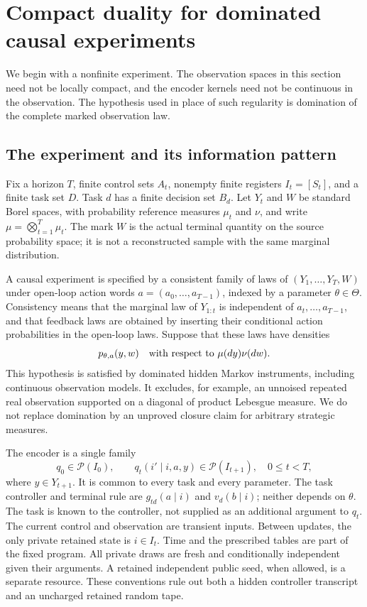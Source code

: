 \section{Compact duality for dominated causal experiments}
\label{sec:v10-compact}

We begin with a nonfinite experiment. The observation spaces in this
section need not be locally compact, and the encoder kernels need not
be continuous in the observation. The hypothesis used in place of such
regularity is domination of the complete marked observation law.

\subsection{The experiment and its information pattern}
Fix a horizon $T$, finite control sets $A_t$, nonempty finite registers
$I_t=[S_t]$, and a finite task set $D$. Task $d$ has a finite decision
set $B_d$. Let $Y_t$ and $W$ be standard Borel spaces, with probability
reference measures $\mu_t$ and $\nu$, and write
$\mu=\bigotimes_{t=1}^T\mu_t$. The mark $W$ is the actual terminal
quantity on the source probability space; it is not a reconstructed
sample with the same marginal distribution.

A causal experiment is specified by a consistent family of laws of
$(Y_1,\ldots,Y_T,W)$ under open-loop action words
$a=(a_0,\ldots,a_{T-1})$, indexed by a parameter $\theta\in\Theta$.
Consistency means that the marginal law of $Y_{1:t}$ is independent of
$a_t,\ldots,a_{T-1}$, and that feedback laws are obtained by inserting
their conditional action probabilities in the open-loop laws. Suppose
that these laws have densities
\begin{equation}\label{eq:v10-density}
 p_{\theta,a}(y,w)\quad\hbox{with respect to }\mu(dy)\nu(dw).
\end{equation}
This hypothesis is satisfied by dominated hidden Markov instruments,
including continuous observation models. It excludes, for example, an
unnoised repeated real observation supported on a diagonal of product
Lebesgue measure. We do not replace domination by an unproved closure
claim for arbitrary strategic measures.

The encoder is a single family
\[
 q_0\in\mathcal P(I_0),\qquad
 q_t(i'\mid i,a,y)\in\mathcal P(I_{t+1}),\quad 0\le t<T,
\]
where $y\in Y_{t+1}$. It is common to every task and every parameter.
The task controller and terminal rule are
$g_{td}(a\mid i)$ and $v_d(b\mid i)$; neither depends on $\theta$.
The task is known to the controller, not supplied as an additional
argument to $q_t$. The current control and observation are transient
inputs. Between updates, the only private retained state is $i\in I_t$.
Time and the prescribed tables are part of the fixed program.
All private draws are fresh and conditionally independent given their
arguments. A retained independent public seed, when allowed, is a
separate resource. These conventions rule out both a hidden controller
transcript and an uncharged retained random tape.

